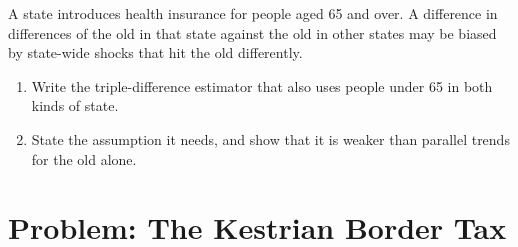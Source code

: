 \begin{exercise}[$\star\star\star$]\label{exo:b3:difference-in-differences:12}
A state introduces health insurance for people aged 65 and over. A
difference in differences of the old in that state against the old in other
states may be biased by state-wide shocks that hit the old differently.
\begin{enumerate}
\item Write the triple-difference estimator that also uses people under 65 in
both kinds of state.
\item State the assumption it needs, and show that it is weaker than
parallel trends for the old alone.
\end{enumerate}
\end{exercise}

\section{Problem: The Kestrian Border Tax}\label{sec:b3:difference-in-differences:problem}

